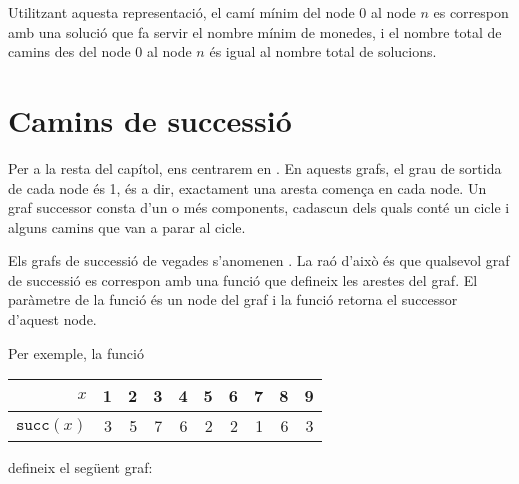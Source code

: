 Utilitzant aquesta representació, el camí mínim del node 0 al node $n$
es correspon amb una solució que fa servir el nombre mínim de monedes,
i el nombre total de camins des del node 0 al node $n$ és igual al
nombre total de solucions.

\section{Camins de successió}

 

Per a la resta del capítol, ens centrarem en . En aquests grafs, el grau de sortida de cada node és 1,
és a dir, exactament una aresta comença en cada node. Un graf
successor consta d'un o més components, cadascun dels quals conté un
cicle i alguns camins que van a parar al cicle.

Els grafs de successió de vegades s'anomenen . La raó d'això és que qualsevol graf de successió es
correspon amb una funció que defineix les arestes del graf. El
paràmetre de la funció és un node del graf i la funció retorna el
successor d'aquest node.

Per exemple, la funció
\begin{center}
\begin{tabular}{r|rrrrrrrrr}
$x$ & 1 & 2 & 3 & 4 & 5 & 6 & 7 & 8 & 9 \\
\hline
$\texttt{succ}(x)$ & 3 & 5 & 7 & 6 & 2 & 2 & 1 & 6 & 3 \\
\end{tabular}
\end{center}
defineix el següent graf:
\begin{center}
\end{center}


